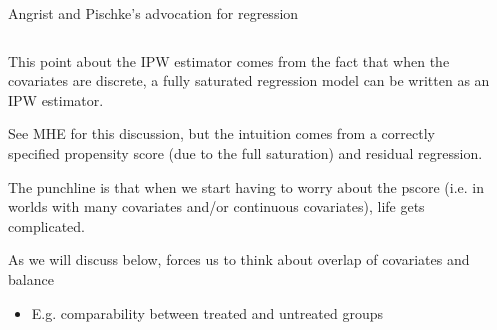 \documentclass[notes,11pt, aspectratio=169]{beamer}
\newenvironment{wideitemize}{\itemize\addtolength{\itemsep}{10pt}}{\enditemize}
\begin{document}
\begin{frame}{Angrist and Pischke's advocation for regression}
\begin{columns}[T] %
  \begin{column}{.65\textwidth}
    \begin{wideitemize}
    \item This point about the IPW estimator comes from the fact that
      when the covariates are discrete, a fully saturated regression
      model can be written as an IPW estimator.
    \item See MHE for this discussion, but the intuition comes from a
      correctly specified propensity score (due to the full
      saturation) and residual regression.
    \item The punchline is that when we start having to worry about
      the pscore (i.e. in worlds with many covariates and/or
      continuous covariates), life gets complicated.
    \item As we will discuss below, forces us to think about overlap of covariates and balance
      \begin{itemize}
      \item E.g. comparability between treated and untreated groups
      \end{itemize}
    \end{wideitemize}
\end{column}%
\hfill%
\begin{column}{.35\textwidth}

\end{column}
\end{columns}
\end{frame}
\end{document}
